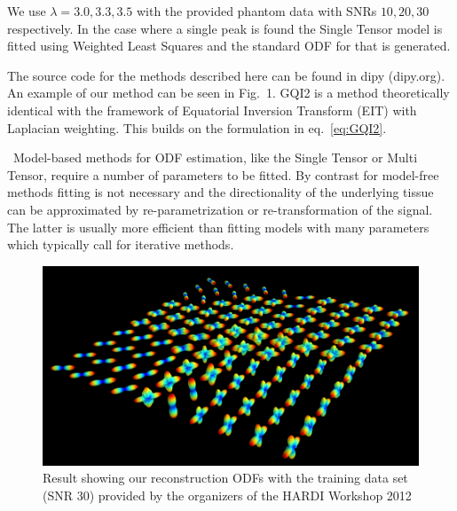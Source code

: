 \documentclass[9pt,conference,a4paper]{IEEEtran}
\begin{document}
We use $\lambda=3.0, 3.3, 3.5$ with the provided phantom data with SNRs $10, 20, 30$
respectively. In the case where a single peak is found the Single
Tensor model is fitted using Weighted Least Squares and the standard
ODF for that is generated. 



The source code for the methods described here can be found in dipy
(dipy.org).  An example of our method can be seen in Fig.~1.  GQI2 is a
method theoretically identical with the framework of Equatorial
Inversion Transform (EIT) \cite{Garyfallidis_thesis} with Laplacian
weighting. This builds on the formulation in eq.~\ref{eq:GQI2}.

\noindent~Model-based methods for ODF estimation, like the Single Tensor
or Multi Tensor, require a number of parameters to be fitted. By
contrast for model-free methods fitting is not necessary and the
directionality of the underlying tissue can be approximated by
re-parametrization or re-transformation of the signal. The latter is
usually more efficient than fitting models with many parameters which
typically call for iterative methods.

%
\begin{figure}
\begin{centering}
\includegraphics{hardi_isbi2012/isbi2012}
\end{centering}
\caption{Result showing our reconstruction ODFs with the training data set
(SNR 30) provided by the organizers of the HARDI Workshop 2012}
\end{figure}
\end{document}
